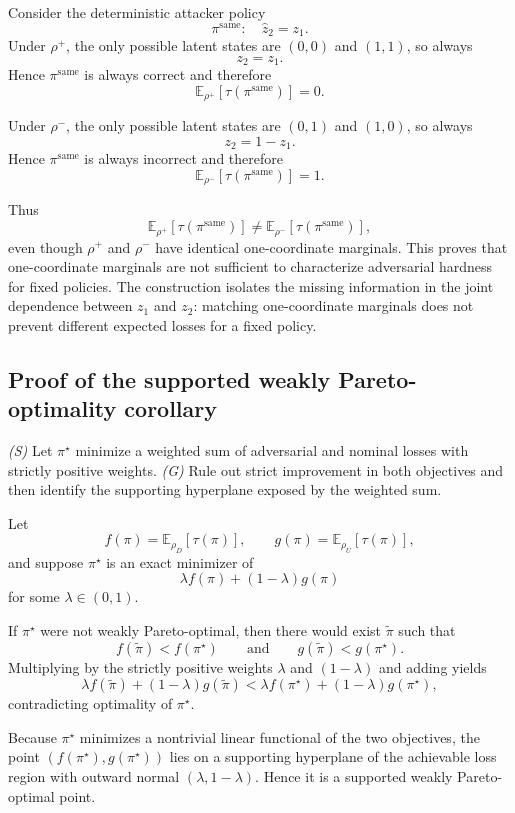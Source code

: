 \documentclass[11pt]{article}
\newcommand{\E}{\mathbb{E}}
\newcommand{\tauT}{\tau}
\begin{document}
Consider the deterministic attacker policy
\[
\pi^{\mathrm{same}}:\quad \hat z_2=z_1.
\]
Under $\rho^{+}$, the only possible latent states are $(0,0)$ and $(1,1)$, so always
\[
z_2=z_1.
\]
Hence $\pi^{\mathrm{same}}$ is always correct and therefore
\[
\E_{\rho^{+}}[\tauT(\pi^{\mathrm{same}})] = 0.
\]

Under $\rho^{-}$, the only possible latent states are $(0,1)$ and $(1,0)$, so always
\[
z_2=1-z_1.
\]
Hence $\pi^{\mathrm{same}}$ is always incorrect and therefore
\[
\E_{\rho^{-}}[\tauT(\pi^{\mathrm{same}})] = 1.
\]

Thus
\[
\E_{\rho^{+}}[\tauT(\pi^{\mathrm{same}})] \neq \E_{\rho^{-}}[\tauT(\pi^{\mathrm{same}})],
\]
even though $\rho^{+}$ and $\rho^{-}$ have identical one-coordinate marginals. This proves that one-coordinate marginals are not sufficient to characterize adversarial hardness for fixed policies.
The construction isolates the missing information in the joint dependence between $z_1$ and $z_2$: matching one-coordinate marginals does not prevent different expected losses for a fixed policy.

\subsection{Proof of the supported weakly Pareto-optimality corollary}

\noindent\textit{(S)} Let $\pi^\star$ minimize a weighted sum of adversarial and nominal losses with strictly positive weights. \textit{(G)} Rule out strict improvement in both objectives and then identify the supporting hyperplane exposed by the weighted sum.

Let
\[
f(\pi)=\E_{\rho_D}[\tauT(\pi)],
\qquad
g(\pi)=\E_{\rho_U}[\tauT(\pi)],
\]
and suppose $\pi^\star$ is an exact minimizer of
\[
\lambda f(\pi)+(1-\lambda)g(\pi)
\]
for some $\lambda\in(0,1)$.

If $\pi^\star$ were not weakly Pareto-optimal, then there would exist $\tilde{\pi}$ such that
\[
f(\tilde{\pi})<f(\pi^\star)
\qquad\text{and}\qquad
g(\tilde{\pi})<g(\pi^\star).
\]
Multiplying by the strictly positive weights $\lambda$ and $(1-\lambda)$ and adding yields
\[
\lambda f(\tilde{\pi})+(1-\lambda)g(\tilde{\pi})
<
\lambda f(\pi^\star)+(1-\lambda)g(\pi^\star),
\]
contradicting optimality of $\pi^\star$.

Because $\pi^\star$ minimizes a nontrivial linear functional of the two objectives, the point $(f(\pi^\star),g(\pi^\star))$ lies on a supporting hyperplane of the achievable loss region with outward normal $(\lambda,1-\lambda)$. Hence it is a supported weakly Pareto-optimal point.
\end{document}
